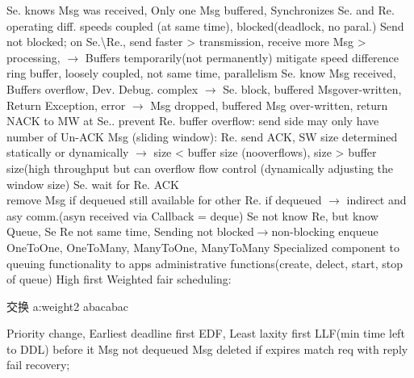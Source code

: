 \btext{++:}
Se. knows Msg was received,
Only one Msg buffered,
Synchronizes Se. and Re. operating diff. speeds
\btext{--:}
coupled (at same time),
blocked(deadlock, no paral.)  
Send not blocked; 
 on Se.\textbackslash Re.,
 send faster > transmission,
 receive more Msg > processing,
$\rightarrow$
Buffers temporarily(not permanently) mitigate speed difference
\btext{++:}
ring buffer,
loosely coupled, not same time,
parallelism
\btext{-:}
Se. know Msg received,
Buffers overflow,
Dev. Debug. complex
$\rightarrow$
Se. block,
buffered Msgover-written,
Return Exception, error
\textbar
{}
$\rightarrow$
Msg dropped,
buffered Msg over-written,
return NACK to MW at Se..
prevent Re. buffer overflow:
send side may only have number of Un-ACK Msg (sliding window):
Re. send ACK,
SW size determined statically or dynamically
$\rightarrow$
size < buffer size (nooverflows),
size > buffer size(high throughput but can overflow
flow control (dynamically adjusting the window size)
Se. wait for Re. ACK
\\
%
%
%
remove Msg if dequeued
still available for other Re. if dequeued
$\rightarrow$
indirect and asy comm.(asyn received via Callback = deque)
Se not know Re, but know Queue,
Se Re not same time,
Sending not blocked$\rightarrow$non-blocking enqueue
OneToOne, OneToMany, ManyToOne, ManyToMany
Specialized component to queuing functionality to apps
administrative functions(create, delect, start, stop of queue)
High first
Weighted fair scheduling:\begin{CJK*}{UTF8}{gbsn}交换 a:weight2 abacabac\end{CJK*}
Priority change,
Earliest deadline first EDF,
Least laxity first LLF(min time left to DDL)
before it Msg not dequeued
Msg deleted if expires
match req with reply
\\
%
%
fail recovery;
